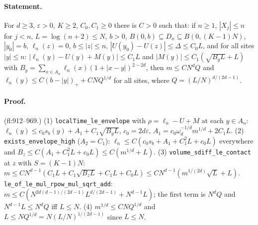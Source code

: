 \paragraph{Statement.} For $d\geq3$, $\varepsilon>0$, $K\geq2$, $C_0,C_1\geq0$ there is $C>0$ such that: if $n\geq1$, $|X_j|\leq n$ for $j<n$, $L=\log(n+2)\leq N$, $b>0$,
$B(0,b)\subseteq D_n\subseteq B(0,(K-1)N)$, $|y_0|=b$, $\ell_n(z)=0$, $b\leq|z|\leq n$, $|U(y_0)-U(z)|\leq\Delta\leq C_0L$, and for all sites $|y|\leq n$:
$|\ell_n(y)-U(y)+M(y)|\leq C_1L$ and $|M(y)|\leq C_1(\sqrt{B_yL}+L)$ with $B_y=\sum_{x\in A_n}\ell_n(x)(1+|x-y|)^{2-2d}$, then
$m\leq CN^dQ$ and $\ell_n(y)\leq C(b-|y|)_++CNQ^{1/d}$ for all sites, where $Q=(L/N)^{d/(2d-1)}$.
\paragraph{Proof.} (fl:912--969.) (1) \texttt{localTime\_le\_envelope} with $\rho=\ell_n-U+M$ at each $y\in A_n$: $\ell_n(y)\leq c_0s_b(y)+A_1+C_1\sqrt{B_yL}$,
$c_0=2d\varepsilon$, $A_1=c_0\omega_d^{-1/d}m^{1/d}+2C_1L$. (2) \texttt{exists\_envelope\_high} ($A_2=C_1$): $\ell_n\leq C(c_0s_b+A_1+C_1^2L+c_0L)$ everywhere and
$B_z\leq C(A_1+C_1^2L+c_0L)\leq C(m^{1/d}+L)$. (3) \texttt{volume\_sdiff\_le\_contact} at $z$ with $S=(K-1)N$: $m\leq CN^{d-1}(C_1L+C_1\sqrt{B_zL}+C_1L+C_0L)
\leq CN^{d-1}(m^{1/(2d)}\sqrt L+L)$. \texttt{le\_of\_le\_mul\_rpow\_mul\_sqrt\_add}: $m\leq C(N^{2d(d-1)/(2d-1)}L^{d/(2d-1)}+N^{d-1}L)$; the first term is $N^dQ$ and
$N^{d-1}L\leq N^dQ$ iff $L\leq N$. (4) $m^{1/d}\leq CNQ^{1/d}$ and $L\leq NQ^{1/d}=N(L/N)^{1/(2d-1)}$ since $L\leq N$.

